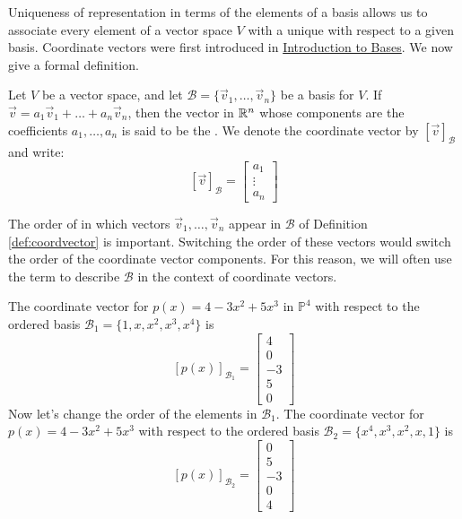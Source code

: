 \documentclass{ximera}
\begin{document}
Uniqueness of representation in terms of the elements of a basis allows us to associate every element of a vector space $V$ with a unique  with respect to a given basis.  Coordinate vectors were first introduced in \href{https://ximera.osu.edu/linearalgebradzv3/LinearAlgebraInteractiveIntro/VSP-0030/main}{Introduction to Bases}.  We now give a formal definition.

\begin{definition}\label{def:coordvector}
Let $V$ be a vector space, and let $\mathcal{B}=\{\vec{v}_1, \ldots ,\vec{v}_n\}$ be a basis for $V$.  If $\vec{v}=a_1\vec{v}_1+\ldots +a_n\vec{v}_n$, then the vector in $\mathbb{R}^n$ whose components are the coefficients $a_1, \ldots ,a_n$  is said to be the .  We denote the coordinate vector by $[\vec{v}]_{\mathcal{B}}$ and write:
$$[\vec{v}]_{\mathcal{B}}=\begin{bmatrix}a_1\\\vdots \\a_n\end{bmatrix}$$
\end{definition}

\begin{remark}\label{rem:coordVectOrder}
The order of in which vectors $\vec{v}_1, \ldots ,\vec{v}_n$ appear in $\mathcal{B}$ of Definition \ref{def:coordvector} is important.  Switching the order of these vectors would switch the order of the coordinate vector components.  For this reason, we will often use the term  to describe $\mathcal{B}$ in the context of coordinate vectors.
\end{remark}

\begin{example}\label{ex:coordvectorinpolyvectspace}
The coordinate vector for $p(x)=4-3x^2+5x^3$ in $\mathbb{P}^4$ with respect to the ordered basis $\mathcal{B}_1=\{1, x, x^2, x^3, x^4\}$ is 
$$[p(x)]_{\mathcal{B}_1}=\begin{bmatrix}4\\0\\-3\\5\\0\end{bmatrix}$$
Now let's change the order of the elements in $\mathcal{B}_1$.  The coordinate vector for $p(x)=4-3x^2+5x^3$ with respect to the ordered basis $\mathcal{B}_2=\{x^4, x^3, x^2, x, 1\}$ is 
$$[p(x)]_{\mathcal{B}_2}=\begin{bmatrix}0\\5\\-3\\0\\4\end{bmatrix}$$
\end{example}
\end{document}
